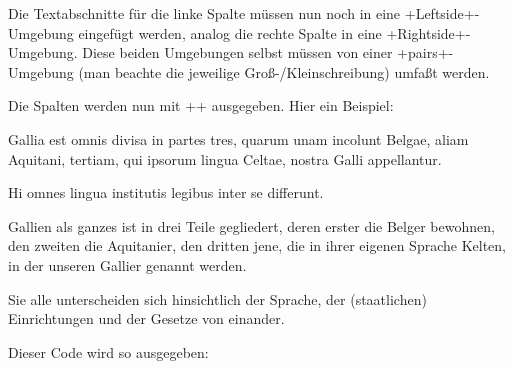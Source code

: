 Die Textabschnitte für die linke Spalte müssen nun noch in eine +Leftside+-Umgebung eingefügt werden, analog die rechte Spalte in eine +Rightside+-Umgebung.
Diese beiden Umgebungen selbst müssen von einer +pairs+-Umgebung (man beachte die jeweilige Groß-/Kleinschreibung) umfaßt werden.

Die Spalten werden nun mit +\Columns+ ausgegeben. Hier ein Beispiel:



\begin{lfgwcode}{}
\begin{pairs}
\begin{Leftside}
\beginnumbering
\autopar
{}

Gallia est omnis divisa in partes tres, 
    quarum unam incolunt Belgae,
    aliam Aquitani,
    tertiam, qui ipsorum lingua Celtae, nostra Galli appellantur.

Hi omnes lingua institutis legibus inter se differunt.

\endnumbering
\end{Leftside}

\begin{Rightside}
\beginnumbering
\autopar

Gallien als ganzes ist in drei Teile gegliedert,
    deren erster die Belger bewohnen,
    den zweiten die Aquitanier,
    den dritten jene, die in ihrer eigenen Sprache Kelten, in der unseren Gallier genannt werden.

Sie alle unterscheiden sich hinsichtlich der Sprache, 
    der (staatlichen) Einrichtungen und der Gesetze von einander.
    
\endnumbering
\end{Rightside}
\end{pairs}

\Columns
\end{lfgwcode}

Dieser Code wird so ausgegeben:

\setlength{\Lcolwidth}{0.425\textwidth}
\setlength{\Rcolwidth}{0.425\textwidth}

